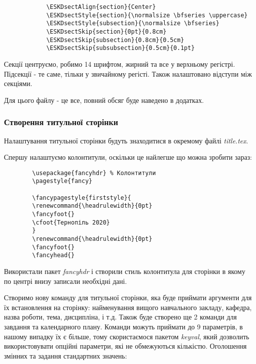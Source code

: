 \begin{lstlisting}
			\ESKDsectAlign{section}{Center}
			\ESKDsectStyle{section}{\normalsize \bfseries \uppercase}
			\ESKDsectStyle{subsection}{\normalsize \bfseries}
			\ESKDsectSkip{section}{0pt}{0.8cm}
			\ESKDsectSkip{subsection}{0.8cm}{0.5cm}
			\ESKDsectSkip{subsubsection}{0.5cm}{0.1pt}
\end{lstlisting}

Секції центруємо, робимо 14 шрифтом, жирний та все у верхньому регістрі. Підсекції - те саме, тільки у звичайному регісті. Також налаштовано відступи між секціями.

Для цього файлу - це все, повний обсяг буде наведено в додатках.

\subsubsection{Створення титульної сторінки}

Налаштування титульної сторінки будуть знаходитися в окремому файлі \textit{title.tex}.

Спершу налаштуємо колонтитули, оскільки це найлегше що можна зробити зараз:
\begin{lstlisting}
		\usepackage{fancyhdr} % Колонтитули
		\pagestyle{fancy}
		
		\fancypagestyle{firststyle}{
		\renewcommand{\headrulewidth}{0pt}
		\fancyfoot{}
		\cfoot{Тернопіль 2020}
		}
		\renewcommand{\headrulewidth}{0pt}
		\fancyfoot{}
		\fancyhead{}
\end{lstlisting}

Використали пакет \textit{fancyhdr} і створили стиль колонтитула для сторінки в якому по центрі внизу записали необхідні дані. 

Створимо нову команду для титульної сторінки, яка буде приймати аргументи для їх встановлення на сторінку: найменування вищого навчального закладу, кафедра, назва роботи, тема, дисципліна, і т.д. Також буде створено ще 2 команди для завдання та календарного плану. Команди можуть приймати до 9 параметрів, в нашому випадку їх є більше, тому скористаємося пакетом \textit{keyval}, який дозволить використовувати опційні параметри, які не обмежуються кількістю.
Оголошення змінних та задання стандартних значень:

